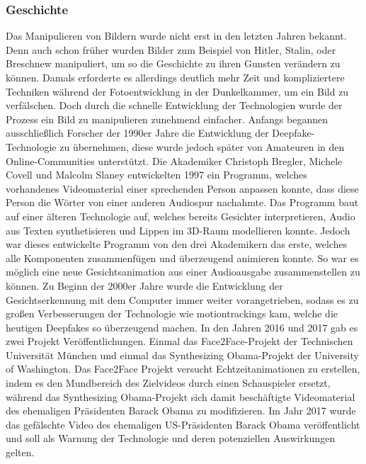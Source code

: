 \subsubsection*{Geschichte}
Das Manipulieren von Bildern wurde nicht erst in den letzten Jahren bekannt. Denn auch schon früher wurden Bilder zum Beispiel von Hitler, Stalin, oder Breschnew manipuliert, um so die Geschichte zu ihren Gunsten verändern zu können.
Damals erforderte es allerdings deutlich mehr Zeit und kompliziertere Techniken während der Fotoentwicklung in der Dunkelkammer, um ein Bild zu verfälschen. Doch durch die schnelle Entwicklung der Technologien wurde der Prozess ein Bild zu manipulieren zunehmend einfacher.
Anfangs begannen ausschließlich Forscher der 1990er Jahre die Entwicklung der Deepfake-Technologie zu übernehmen, diese wurde jedoch später von Amateuren in den Online-Communities unterstützt.
Die Akademiker Christoph Bregler, Michele Covell und Malcolm Slaney entwickelten 1997 ein Programm, welches vorhandenes Videomaterial einer sprechenden Person anpassen konnte, dass diese Person die Wörter von einer anderen Audiospur nachahmte.
Das Programm baut auf einer älteren Technologie auf, welches bereits Gesichter interpretieren, Audio aus Texten synthetisieren und Lippen im 3D-Raum modellieren konnte.
Jedoch war dieses entwickelte Programm von den drei Akademikern das erste, welches alle Komponenten zusammenfügen und überzeugend animieren konnte. So war es möglich eine neue Gesichtsanimation aus einer Audioausgabe zusammenstellen zu können.\newline
Zu Beginn der 2000er Jahre wurde die Entwicklung der Gesichtserkennung mit dem Computer immer weiter vorangetrieben,
sodass es zu großen Verbesserungen der Technologie wie \glspl{motiontracking} kam, welche die heutigen Deepfakes so
überzeugend machen.\newline
In den Jahren 2016 und 2017 gab es zwei Projekt Veröffentlichungen. Einmal das Face2Face-Projekt der Technischen Universität München und einmal das Synthesizing Obama-Projekt der University of Washington. \newline
Das Face2Face Projekt versucht Echtzeitanimationen zu erstellen, indem es den Mundbereich des Zielvideos durch einen Schauspieler ersetzt, während das Synthesizing Obama-Projekt sich damit beschäftigte Videomaterial des ehemaligen Präsidenten Barack Obama zu modifizieren.\cite{ResearchGate}\newline
Im Jahr 2017 wurde das gefälschte Video des ehemaligen US-Präsidenten Barack Obama veröffentlicht und soll als Warnung der Technologie und deren potenziellen Auswirkungen gelten.
